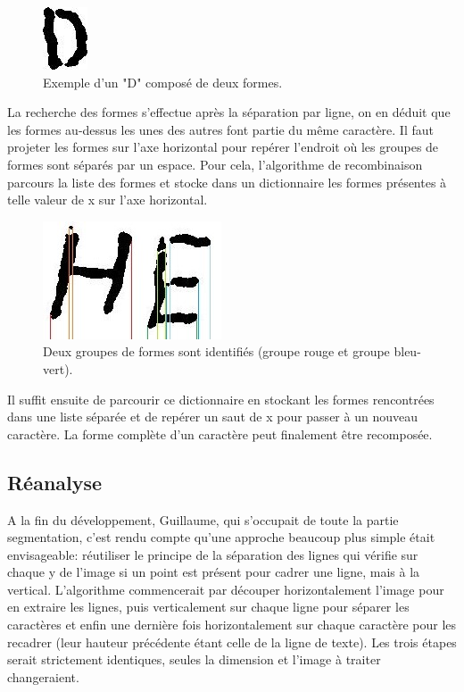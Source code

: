 \documentclass[a4paper, 12pt]{article}
\begin{document}
\begin{figure}[!ht]
\centering
\includegraphics[scale=1]{img/1-9.jpg}
\caption{Exemple d'un "D" composé de deux formes.}
\end{figure}

La recherche des formes s'effectue après la séparation par ligne, on en déduit que les formes au-dessus les unes des autres font partie du même caractère. Il faut projeter les formes sur l'axe horizontal pour repérer l'endroit où les groupes de formes sont séparés par un espace. Pour cela, l'algorithme de recombinaison parcours la liste des formes et stocke dans un dictionnaire les formes présentes à telle valeur de x sur l'axe horizontal.

\begin{figure}[!ht]
\centering
\includegraphics[scale=1]{img/recomposition.jpg}
\caption{Deux groupes de formes sont identifiés (groupe rouge et groupe bleu-vert).}
\end{figure}

Il suffit ensuite de parcourir ce dictionnaire en stockant les formes rencontrées dans une liste séparée et de repérer un saut de x pour passer à un nouveau caractère. La forme complète d'un caractère peut finalement être recomposée.

\subsection{Réanalyse}
A la fin du développement, Guillaume, qui s'occupait de toute la partie segmentation, c'est rendu compte qu'une approche beaucoup plus simple était envisageable: réutiliser le principe de la séparation des lignes qui vérifie sur chaque y de l'image si un point est présent pour cadrer une ligne, mais à la vertical. L'algorithme commencerait par découper horizontalement l'image pour en extraire les lignes, puis verticalement sur chaque ligne pour séparer les caractères et enfin une dernière fois horizontalement sur chaque caractère pour les recadrer (leur hauteur précédente étant celle de la ligne de texte). Les trois étapes serait strictement identiques, seules la dimension et l'image à traiter changeraient.
\end{document}
